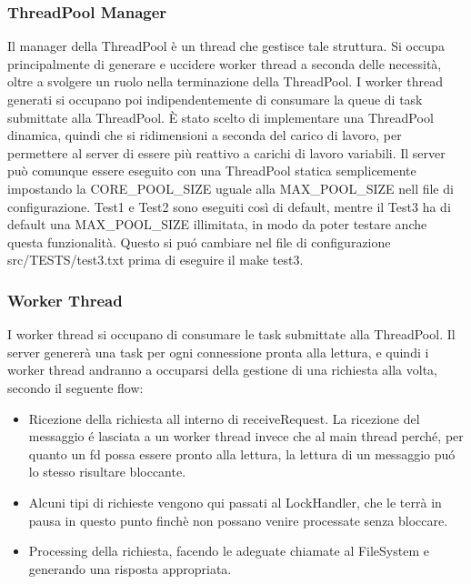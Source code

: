 \documentclass[11pt]{article}
\begin{document}
\begin{flushleft}
\subsubsection{ThreadPool Manager}
Il manager della ThreadPool è un thread che gestisce tale struttura. Si occupa principalmente di generare e uccidere worker thread a seconda delle necessità, oltre a svolgere un ruolo nella terminazione della ThreadPool. I worker thread generati si occupano poi indipendentemente di consumare la queue di task submittate alla ThreadPool.
È stato scelto di implementare una ThreadPool dinamica, quindi che si ridimensioni a seconda del carico di lavoro, per permettere al server di essere più reattivo a carichi di lavoro variabili.
Il server può comunque essere eseguito con una ThreadPool statica semplicemente impostando la CORE\_POOL\_SIZE uguale alla MAX\_POOL\_SIZE nell file di configurazione. Test1 e Test2 sono eseguiti così di default, mentre il Test3 ha di default una MAX\_POOL\_SIZE illimitata, in modo da poter testare anche questa funzionalità. Questo si puó cambiare nel file di configurazione src/TESTS/test3.txt prima di eseguire il make test3.

\subsubsection{Worker Thread}
I worker thread si occupano di consumare le task submittate alla ThreadPool. Il server genererà una task per ogni connessione pronta alla lettura, e quindi i worker thread andranno a occuparsi della gestione di una richiesta alla volta, secondo il seguente flow: 
\begin{itemize}

\item Ricezione della richiesta all interno di receiveRequest. La ricezione del messaggio é lasciata a un worker thread invece che al main thread perché, per quanto un fd possa essere pronto alla lettura, la lettura di un messaggio puó lo stesso risultare bloccante.

\item Alcuni tipi di richieste vengono qui passati al LockHandler, che le terrà in pausa in questo punto finchè non possano venire processate senza bloccare.

\item Processing della richiesta, facendo le adeguate chiamate al FileSystem e generando una risposta appropriata.
\end{itemize}


\end{flushleft}
\end{document}
